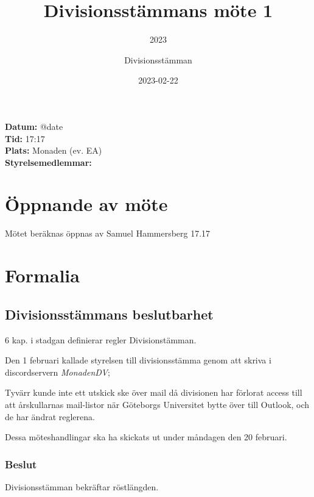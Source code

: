 \documentclass[protokoll]{dvd}
\begin{document}
\title{Divisionsstämmans möte 1}
\subtitle{2023}
\author{Divisionsstämman}
\date{2023-02-22}

\textbf{Datum:} \csname @date\endcsname\\
\textbf{Tid:} 17:17\\
\textbf{Plats:} Monaden (ev. EA)\\
\textbf{Styrelsemedlemmar:}
\begin{närvarande_förtroendevalda}
\end{närvarande_förtroendevalda}


\section{Öppnande av möte}
Mötet beräknas öppnas av Samuel Hammersberg 17.17

\section{Formalia}

\subsection{Divisionsstämmans beslutbarhet}

6 kap. i stadgan definierar regler Divisionstämman.

Den 1 februari kallade styrelsen till divisionsstämma genom att skriva i discordservern \emph{MonadenDV};

Tyvärr kunde inte ett utskick ske över mail då divisionen har förlorat access till
att årskullarnas mail-listor när Göteborgs Universitet bytte över till Outlook, och
de har ändrat reglerena.

Dessa möteshandlingar ska ha skickats ut under måndagen den 20 februari.

\subsubsection*{Beslut}
Divisionsstämman bekräftar röstlängden.
\end{document}
